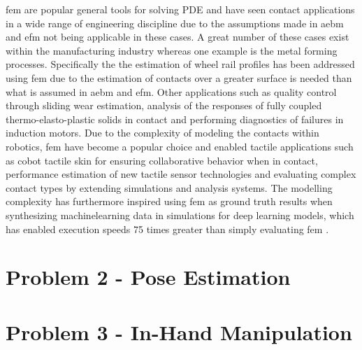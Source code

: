 \gls{fem} are popular general tools for solving PDE\cite*{history-of-finite-element-method:-a-review} and have seen contact applications in a wide range of engineering discipline due to the assumptions made in \gls{aebm} and \gls{efm} not being applicable in these cases. A great number of these cases exist within the manufacturing industry\cite*{examples-of-fem-application-in-manufacturing-technology} whereas one example is the metal forming processes. Specifically the the estimation of wheel rail profiles\cite{contact-mechanics-analysis-of-measured-wheel-rail-profiles-using-the-finite-element-method} has been addressed using \gls{fem} due to the estimation of contacts over a greater surface is needed than what is assumed in \gls{aebm} and \gls{efm}. Other applications such as quality control through sliding wear estimation\cite{simulating-sliding-wear-with-finite-element-method}, analysis of the responses of fully coupled thermo-elasto-plastic solids in contact\cite{a-finite-element-procedure-for-the-analysis-of-thermo-mechanical-solids-in-contact} and performing diagnostics of failures in induction motors\cite{induction-motors-fault-diagnosis-using-finite-element-method:-a-review}. Due to the complexity of modeling the contacts within robotics, \gls{fem} have become a popular choice and enabled tactile applications such as \gls{cobot} tactile skin for ensuring collaborative behavior when in contact\cite{soft-robot-skin-with-conformal-adaptability-for-on-body-tactile-perception-of-collaborative-robots}, performance estimation of new tactile sensor technologies\cite*{design-and-experimental-research-of-robot-finger-sliding-tactile-sensor-based-on-fbg} and evaluating complex contact types by extending simulations and analysis systems\cite*{grasp-analysis-using-deformable-fingers}.
The modelling complexity has furthermore inspired using \gls{fem} as ground truth results when synthesizing machinelearning data in simulations for deep learning models, which has enabled execution speeds 75 times greater than simply evaluating \gls{fem}\cite*{sim-to-real-for-robotic-tactile-sensing-via-physics-based-simulation-and-learned-latent-projections} 
\cite*{interpreting-and-predicting-tactile-signals-via-a-physics-based-and-data-driven-framework}
\cite*{ground-truth-force-distribution-for-learning-based-tactile-sensing:-a-finite-element-approach}.

\section{Problem 2 - Pose Estimation} \label{sec:lit-rev-problem-2}

\section{Problem 3 - In-Hand Manipulation} \label{sec:lit-rev-problem-3}